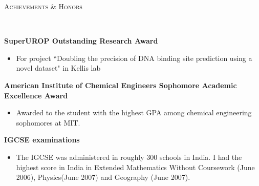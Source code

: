 \documentclass{article}
\newenvironment{changemargin}[2]{%
  \begin{list}{}{%
    \setlength{\topsep}{0pt}%
    \setlength{\leftmargin}{#1}%
    \setlength{\rightmargin}{#2}%
    \setlength{\listparindent}{\parindent}%
    \setlength{\itemindent}{\parindent}%
    \setlength{\parsep}{\parskip}%
  }%
  \item[]}{\end{list}
}
\newcommand{\lineover}{
	\begin{changemargin}{-0.05in}{-0.05in}
		\vspace*{-8pt}
		\hrulefill \\
		\vspace*{-2pt}
	\end{changemargin}
}
\newcommand{\header}[1]{
	\begin{changemargin}{-0.5in}{-0.5in}
		\scshape{#1}\\
  	\lineover
	\end{changemargin}
}
\newenvironment{body} {
	\vspace*{-16pt}
	\begin{changemargin}{-0.25in}{-0.5in}
  }	
	{\end{changemargin}
}
\begin{document}
\header{Achievements \& Honors}

\begin{body}
	  \small{	  
	  \vspace{17pt}
	   \textbf{SuperUROP Outstanding Research Award}
	    \begin{itemize}
	     \item For project ``Doubling the precision of DNA binding site prediction using a novel dataset" in Kellis lab
	    \end{itemize}
	  \textbf{American Institute of Chemical Engineers Sophomore Academic Excellence Award}
	    \begin{itemize}
	     \item Awarded to the student with the highest GPA among chemical engineering sophomores at MIT. 
	    \end{itemize}
	  \textbf{IGCSE examinations}
	    \begin{itemize}
	     \item The IGCSE was administered in roughly 300 schools in India. I had the highest score in India in Extended Mathematics Without Coursework (June 2006), Physics(June 2007) and Geography (June 2007).
	    \end{itemize}
 	   }
\end{body}
\end{document}
